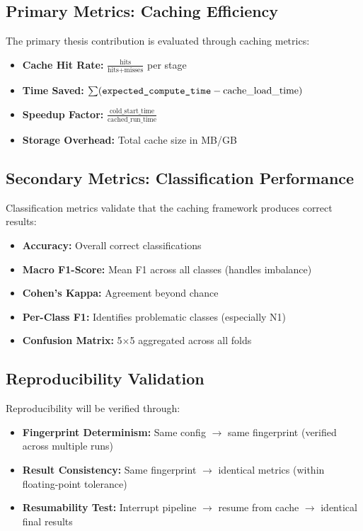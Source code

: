 \documentclass{imc-inf} %
\begin{document}
\subsection{Primary Metrics: Caching Efficiency}

The primary thesis contribution is evaluated through caching metrics:

\begin{itemize}
\item \textbf{Cache Hit Rate:} $\frac{\text{hits}}{\text{hits} + \text{misses}}$ per stage
\item \textbf{Time Saved:} $\sum(\verb|expected_compute_time| - \text{cache\_load\_time})$
\item \textbf{Speedup Factor:} $\frac{\text{cold\_start\_time}}{\text{cached\_run\_time}}$
\item \textbf{Storage Overhead:} Total cache size in MB/GB
\end{itemize}

\subsection{Secondary Metrics: Classification Performance}

Classification metrics validate that the caching framework produces correct results:

\begin{itemize}
\item \textbf{Accuracy:} Overall correct classifications
\item \textbf{Macro F1-Score:} Mean F1 across all classes (handles imbalance)
\item \textbf{Cohen's Kappa:} Agreement beyond chance
\item \textbf{Per-Class F1:} Identifies problematic classes (especially N1)
\item \textbf{Confusion Matrix:} 5$\times$5 aggregated across all folds
\end{itemize}

\subsection{Reproducibility Validation}

Reproducibility will be verified through:

\begin{itemize}
\item \textbf{Fingerprint Determinism:} Same config $\rightarrow$ same fingerprint (verified across multiple runs)
\item \textbf{Result Consistency:} Same fingerprint $\rightarrow$ identical metrics (within floating-point tolerance)
\item \textbf{Resumability Test:} Interrupt pipeline $\rightarrow$ resume from cache $\rightarrow$ identical final results
\end{itemize}
\end{document}
